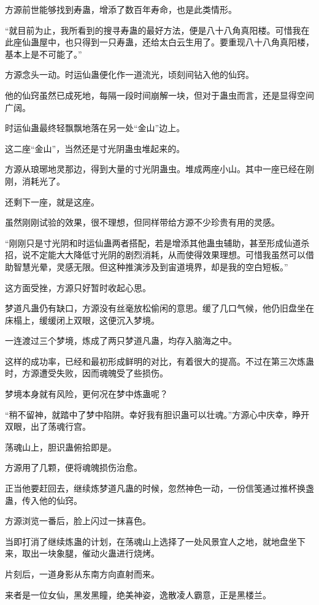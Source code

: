 \begin{this_body}
方源前世能够找到寿蛊，增添了数百年寿命，也是此类情形。

“就目前为止，我所看到的搜寻寿蛊的最好方法，便是八十八角真阳楼。可惜我在此座仙蛊屋中，也只得到一只寿蛊，还给太白云生用了。要重现八十八角真阳楼，基本上是不可能了。”

方源念头一动。时运仙蛊便化作一道流光，顷刻间钻入他的仙窍。

他的仙窍虽然已成死地，每隔一段时间崩解一块，但对于蛊虫而言，还是显得空间广阔。

时运仙蛊最终轻飘飘地落在另一处“金山”边上。

这二座“金山”，当然还是寸光阴蛊虫堆起来的。

方源从琅琊地灵那边，得到大量的寸光阴蛊虫。堆成两座小山。其中一座已经在刚刚，消耗光了。

还剩下一座，就是这座。

虽然刚刚试验的效果，很不理想，但同样带给方源不少珍贵有用的灵感。

“刚刚只是寸光阴和时运仙蛊两者搭配，若是增添其他蛊虫辅助，甚至形成仙道杀招，说不定能大大降低寸光阴的剧烈消耗，从而使得效果理想。可惜我虽然可以借助智慧光晕，灵感无限。但这种推演涉及到宙道境界，却是我的空白短板。”

这方面受挫，方源只好暂时收起心思。

梦道凡蛊仍有缺口，方源没有丝毫放松偷闲的意思。缓了几口气候，他仍旧盘坐在床榻上，缓缓闭上双眼，这便沉入梦境。

一连渡过三个梦境，炼成了两只梦道凡蛊，均存入脑海之中。

这样的成功率，已经和最初形成鲜明的对比，有着很大的提高。不过在第三次炼蛊时，方源遭受失败，因而魂魄受了些损伤。

梦境本身就有风险，更何况在梦中炼蛊呢？

“稍不留神，就踏中了梦中陷阱。幸好我有胆识蛊可以壮魂。”方源心中庆幸，睁开双眼，出了荡魂行宫。

荡魂山上，胆识蛊俯拾即是。

方源用了几颗，便将魂魄损伤治愈。

正当他要赶回去，继续炼梦道凡蛊的时候，忽然神色一动，一份信笺通过推杯换盏蛊，传入他的仙窍。

方源浏览一番后，脸上闪过一抹喜色。

当即打消了继续炼蛊的计划，在荡魂山上选择了一处风景宜人之地，就地盘坐下来，取出一块象腿，催动火蛊进行烧烤。

片刻后，一道身影从东南方向直射而来。

来者是一位女仙，黑发黑瞳，绝美神姿，逸散凌人霸意，正是黑楼兰。


\end{this_body}
